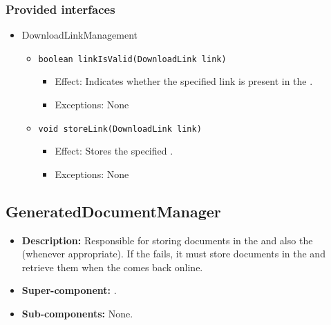 \subsubsection*{Provided interfaces}
\begin{itemize}
    \item DownloadLinkManagement
    \begin{itemize}
        \item \texttt{boolean linkIsValid(DownloadLink link)}
        \begin{itemize}
            \item Effect: Indicates whether the specified link is present in the .
            \item Exceptions: None
        \end{itemize}

        \item \texttt{void storeLink(DownloadLink link)}
		    \begin{itemize}
                \item Effect: Stores the specified .
                \item Exceptions: None
            \end{itemize}
    \end{itemize}
\end{itemize}

\subsection{GeneratedDocumentManager}
\begin{itemize}
    \item \textbf{Description:} Responsible for storing documents in the  and also the  (whenever appropriate). If the  fails, it must store documents in the  and retrieve them when the  comes back online.
    \item \textbf{Super-component:} .
    \item \textbf{Sub-components:} None.
\end{itemize}

